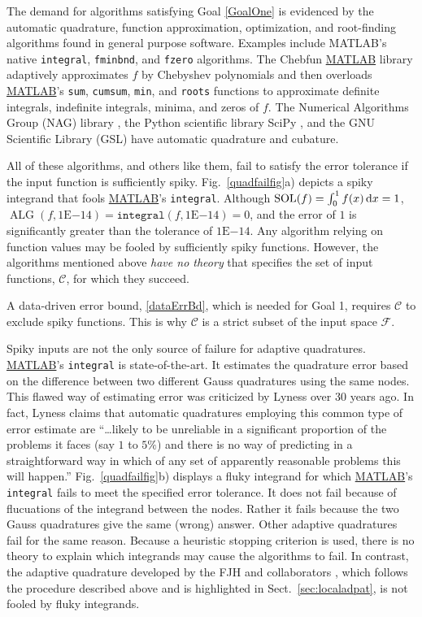 \documentclass[11pt]{NSFamsart}
\newcommand{\MATLAB}{\hyperlink{MATLABlink}{MATLAB}\xspace}
\DeclareMathOperator{\SOL}{SOL}
\DeclareMathOperator{\ALG}{ALG}
\def\dif{\textup{d}}
\newcommand{\calc}{{\mathcal{C}}}
\newcommand{\calf}{{\mathcal{F}}}
\begin{document}
The demand for algorithms satisfying Goal \ref{GoalOne} is evidenced by the automatic quadrature, function approximation, optimization, and root-finding algorithms found in general purpose software.  Examples include \hypertarget{MATLABlink}{MATLAB}'s \cite{MAT9.5} native \texttt{integral}, \texttt{fminbnd}, and \texttt{fzero} algorithms.  The \hypertarget{Chebfunlink}{Chebfun} \cite{TrefEtal17a} \MATLAB library adaptively approximates $f$ by Chebyshev polynomials and then overloads \MATLAB's \texttt{sum}, \texttt{cumsum}, \texttt{min}, and \texttt{roots} functions to approximate definite integrals, indefinite integrals, minima, and zeros of $f$.  The  Numerical Algorithms Group
(\hypertarget{NAGlink}{NAG}) library \citep{NAG23}, the Python scientific library \hypertarget{SciPylink}{SciPy} \cite{SCIPY}, and the GNU Scientific Library (\hypertarget{GSLlink}{GSL}) \cite{GSL} have automatic quadrature and cubature. 

All of these algorithms, and others like them, fail to satisfy the error tolerance if the input function is sufficiently spiky.  Fig.\ \ref{quadfailfig}a) depicts a spiky integrand that fools \MATLAB's \texttt{integral}.  Although $\SOL(f) = \int_0^1 f(x) \, \dif x = 1$, $\ALG(f,1\text{E}{-14}) = \texttt{integral}(f,1\text{E}{-14}) = 0$, and the error of $1$ is significantly greater than the tolerance of $1\text{E}{-14}$.  Any algorithm relying on function values may be fooled by sufficiently spiky functions.  However, the algorithms mentioned above \emph{have no theory} that specifies the set of input functions, $\calc$, for which they succeed.

A data-driven error bound, \eqref{dataErrBd}, which is needed for Goal 1, requires $\calc$ to exclude spiky functions.  This is why $\calc$ is a strict subset of the input space $\calf$.

Spiky inputs are not the only source of failure for adaptive quadratures. 
\MATLAB's
\texttt{integral} \cite{Sha08a, MAT9.5} is state-of-the-art.  It estimates the quadrature error based on the difference between two different Gauss quadratures using the same nodes. This flawed way of estimating error was criticized by 
Lyness \cite[p.\ 69]{Lyn83} over 30 years ago.  In fact, Lyness claims that automatic quadratures employing this common type of error estimate are ``\ldots likely to be unreliable in a significant proportion of the problems it faces 
	(say $1$ to $5\%$) and there is no way of predicting in a straightforward way in which of any set
	of apparently reasonable problems this will happen.''
Fig.\ \ref{quadfailfig}b) displays a fluky integrand for which \MATLAB's \texttt{integral} fails to meet the specified error tolerance.  It does not fail because of flucuations of the integrand between the nodes.  Rather it fails because the two Gauss quadratures give the same (wrong) answer.  Other adaptive quadratures fail for the same reason.  Because a heuristic stopping criterion is used, there is no theory to explain which integrands may cause the algorithms to fail.  In contrast, the adaptive quadrature developed by the FJH and collaborators \cite{HicEtal14b, Zha18a}, which follows the procedure described above and is highlighted in Sect.\ \ref{sec:localadpat}, is not fooled by fluky integrands.
\end{document}
